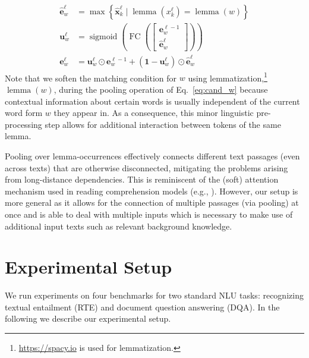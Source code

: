 \documentclass[11pt,a4paper]{article}
\begin{document}
\begin{align}
    \hat{\mathbf{e}}^\ell_w &= \max \left\{ \hat{\mathbf{x}}^{\ell}_k \mid \operatorname{lemma}(x^{\ell}_k) = \operatorname{lemma}(w) \right\}  \label{eq:cand_w} \\
    \mathbf{u}^\ell_{w} &= \operatorname{sigmoid} \left( \operatorname{FC}\left( \begin{bmatrix}  \mathbf{e}^{\ell - 1}_w \\ \hat{\mathbf{e}}^\ell_w \end{bmatrix} \right) \right)  \label{eq:rep_update_gate} \\    %
    \mathbf{e}_w^\ell &= \mathbf{u}^\ell_{w} \odot \mathbf{e}^{\ell-1}_w + (\mathbf{1}-\mathbf{u}^\ell_{w}) \odot \hat{\mathbf{e}}^\ell_w \label{eq:new_w}
\end{align}
\noindent
Note that we soften the matching condition for $w$ using lemmatization,\footnote{\url{https://spacy.io} is used for lemmatization.} $\operatorname{lemma}(w)$, during the pooling operation of Eq.~\ref{eq:cand_w} because contextual information about certain words is usually independent of the current word form $w$ they appear in. As a consequence, this minor linguistic pre-processing step allows for additional interaction between tokens of the same lemma. 

Pooling over lemma-occurrences effectively connects different text passages (even across texts) that are otherwise disconnected, mitigating the problems arising from long-distance dependencies. This is reminiscent of the (soft) attention mechanism used in reading comprehension models (e.g., ). However, our setup is more general as it allows for the connection of multiple passages (via pooling) at once and is able to deal with multiple inputs which is necessary to make use of additional input texts such as relevant background knowledge.

\section{Experimental Setup}
\label{sec:setup}

We run experiments on four benchmarks for two standard NLU tasks: recognizing textual entailment (RTE) and document question answering (DQA). In the following we describe our experimental setup.
\end{document}
